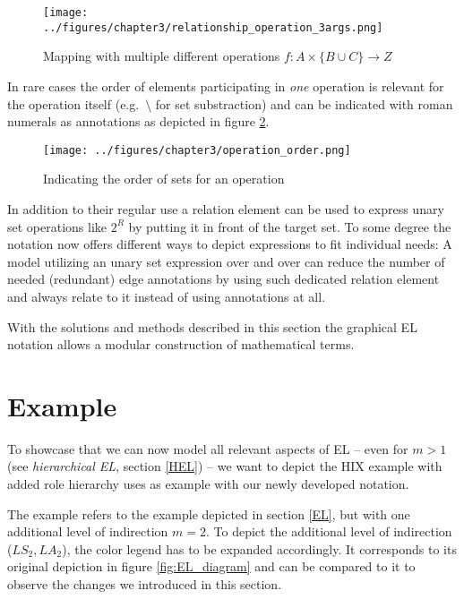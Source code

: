 \documentclass[twoside, openright, 12pt]{book}
\begin{document}
\begin{figure}[!htb]
	\centering
	\texttt{[image: ../figures/chapter3/relationship\_operation\_3args.png]}
	\caption{Mapping with multiple different operations $f:A \times \lbrace B \cup C \rbrace \rightarrow Z$ }
	\label{fig:relationship_operation_3args}
\end{figure}

\noindent
In rare cases the order of elements participating in \textit{one} operation is relevant for the operation itself (e.g.~$\setminus$ for set substraction) and can be indicated with roman numerals as annotations as depicted in figure \ref{fig:operation_order}.

\begin{figure}[!htb]
	\centering
	\texttt{[image: ../figures/chapter3/operation\_order.png]}
	\caption{Indicating the order of sets for an operation}
	\label{fig:operation_order}
\end{figure}

\noindent
In addition to their regular use a relation element can be used to express unary set operations like $2^R$ by putting it in front of the target set.
To some degree the notation now offers different ways to depict expressions to fit individual needs: A model utilizing an unary set expression over and over can reduce the number of needed (redundant) edge annotations by using such dedicated relation element and always relate to it instead of using annotations at all.

With the solutions and methods described in this section the graphical EL notation allows a modular construction of mathematical terms.



\section{Example}
\label{gsl_example}
To showcase that we can now model all relevant aspects of EL -- even for $m>1$ (see \textit{hierarchical EL}, section \ref{HEL}) -- we want to depict the HIX example with added role hierarchy \cite{Amthor18} uses as example with our newly developed notation.

\noindent
The example refers to the example depicted in section \ref{EL}, but with one additional level of indirection $m=2$.
To depict the additional level of indirection ($LS_2, LA_2$), the color legend has to be expanded accordingly.
It corresponds to its original depiction in figure \ref{fig:EL_diagram} and can be compared to it to observe the changes we introduced in this section.
\end{document}
